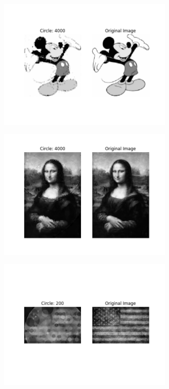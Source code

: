 \documentclass[12pt]{article}
\begin{document}
\begin{figure}[H]
\centering
\noindent\includegraphics[width=0.75\textwidth]{../results/mickey/mickey_4000}
\end{figure}
\begin{figure}[H]
\centering
\noindent\includegraphics[width=0.75\textwidth]{../results/mona_lisa/mona_lisa_4000}
\end{figure}
\begin{figure}[H]
\centering
\noindent\includegraphics[width=0.75\textwidth]{../results/old_glory/old_glory_0200}
\end{figure}
\end{document}
